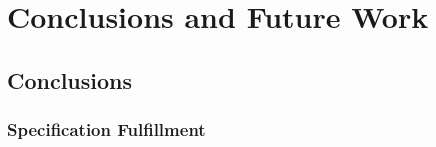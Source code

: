 \chapter{Conclusions and Future Work}
\label{ch:conclusions}

\section{Conclusions}

\subsection{Specification Fulfillment}











